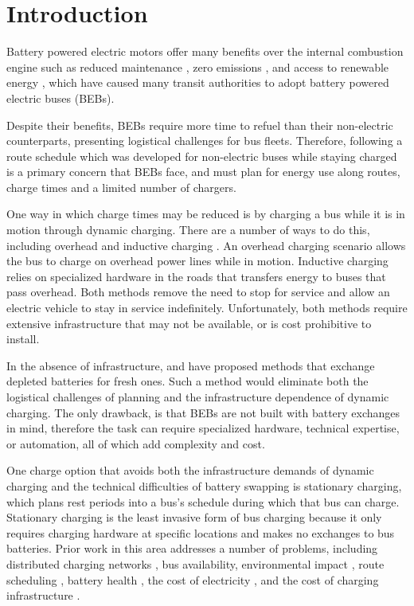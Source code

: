 \section{Introduction}
\par  Battery powered electric motors offer many benefits over the internal combustion engine \cite{Mahmoud2016} such as reduced maintenance \cite{poornesh_comparative_2020}, zero emissions \cite{kato_comparative_2013}, and access to renewable energy \cite{cheng_smart_2020}, which have caused many transit authorities to adopt battery powered electric buses (BEBs). 
\par Despite their benefits, BEBs require more time to refuel than their non-electric counterparts, presenting logistical challenges for bus fleets. Therefore, following a route schedule which was developed for non-electric buses while staying charged is a primary concern that BEBs face, and must plan for energy use along routes, charge times and a limited number of chargers. 
\par One way in which charge times may be reduced is by charging a bus while it is in motion through dynamic charging. There are a number of ways to do this, including overhead \cite{csonka_optimization_2021} and inductive charging \cite{jeong_automatic_2018} \cite{balde_electric_2019}. An overhead charging scenario allows the bus to charge on overhead power lines while in motion. Inductive charging relies on specialized hardware in the roads that transfers energy to buses that pass overhead. Both methods remove the need to stop for service and allow an electric vehicle to stay in service indefinitely. Unfortunately, both methods require extensive infrastructure \cite{Alwesabi_2022_Robust} that may not be available, or is cost prohibitive to install.  
\par In the absence of infrastructure, \cite{jain_battery_2020} and \cite{xian_zhang_optimal_2016} have proposed methods that exchange depleted batteries for fresh ones. Such a method would eliminate both the logistical challenges of planning and the infrastructure dependence of dynamic charging. The only drawback, is that BEBs are not built with battery exchanges in mind, therefore the task can require specialized hardware, technical expertise, or automation, all of which add complexity and cost.  
\par One charge option that avoids both the infrastructure demands of dynamic charging and the technical difficulties of battery swapping is stationary charging, which plans rest periods into a bus's schedule during which that bus can charge. Stationary charging is the least invasive form of bus charging because it only requires charging hardware at specific locations and makes no exchanges to bus batteries. Prior work in this area addresses a number of problems, including distributed charging networks \cite{Nimalsiri2020}, bus availability, environmental impact \cite{zhou_bi-objective_2021}, route scheduling \cite{Rinalde_Mixed_2020}, battery health \cite{houbbadi_optimal_2019}, the cost of electricity \cite{Leou_optimal_2017}, and the cost of charging infrastructure \cite{Wei2018}.
